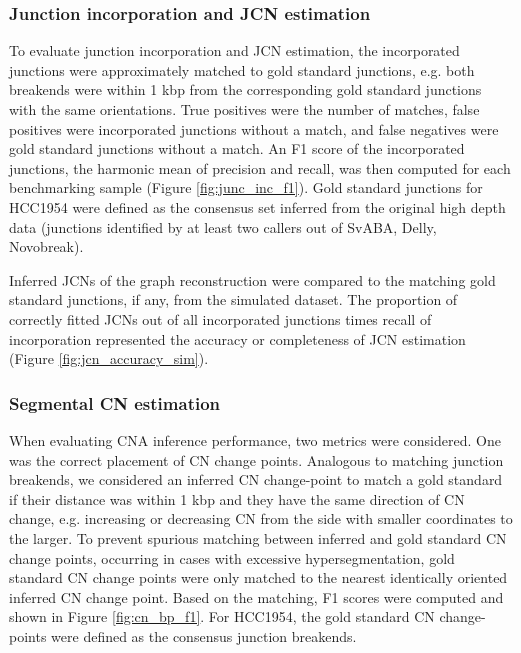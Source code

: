 \documentclass[phd,tocprelim]{cornell}
\begin{document}
\subsubsection*{Junction incorporation and JCN estimation}
To evaluate junction incorporation and JCN estimation, the incorporated junctions were approximately matched to gold standard junctions, e.g. both breakends were within 1 kbp from the corresponding gold standard junctions with the same orientations. True positives were the number of matches, false positives were incorporated junctions without a match, and false negatives were gold standard junctions without a match. An F1 score of the incorporated junctions, the harmonic mean of precision and recall, was then computed for each benchmarking sample (Figure \ref{fig:junc_inc_f1}). Gold standard junctions for HCC1954 were defined as the consensus set inferred from the original high depth data (junctions identified by at least two callers out of SvABA, Delly, Novobreak).

Inferred JCNs of the graph reconstruction were compared to the matching gold standard junctions, if any, from the simulated dataset. The proportion of correctly fitted JCNs out of all incorporated junctions times recall of incorporation represented the accuracy or completeness of JCN estimation (Figure \ref{fig:jcn_accuracy_sim}).

\subsubsection*{Segmental CN estimation}
When evaluating CNA inference performance, two metrics were considered. One was the correct placement of CN change points. Analogous to matching junction breakends, we considered an inferred CN change-point to match a gold standard if their distance was within 1 kbp and they have the same direction of CN change, e.g. increasing or decreasing CN from the side with smaller coordinates to the larger. To prevent spurious matching between inferred and gold standard CN change points, occurring in cases with excessive hypersegmentation, gold standard CN change points were only matched to the nearest identically oriented inferred CN change point.  Based on the matching, F1 scores were computed and shown in Figure \ref{fig:cn_bp_f1}. For HCC1954, the gold standard CN change-points were defined as the consensus junction breakends.

\end{document}
